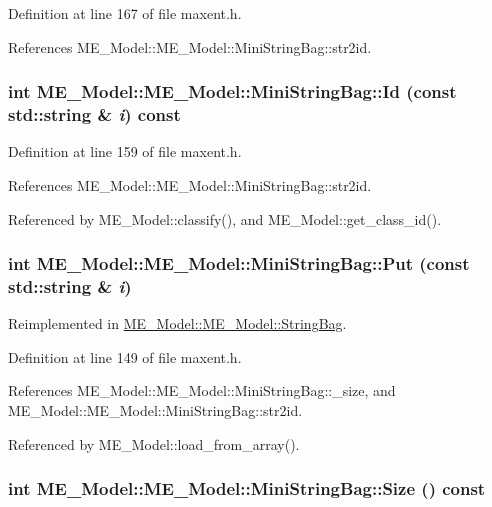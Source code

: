 Definition at line 167 of file maxent.h.

References ME\_\-Model::ME\_\-Model::MiniStringBag::str2id.\hypertarget{structME__Model_1_1MiniStringBag_65ba142e048cf3786852bd42d7171fc1}{
\subsubsection[{Id}]{\setlength{\rightskip}{0pt plus 5cm}int ME\_\-Model::ME\_\-Model::MiniStringBag::Id (const std::string \& {\em i}) const}}
\label{structME__Model_1_1MiniStringBag_65ba142e048cf3786852bd42d7171fc1}




Definition at line 159 of file maxent.h.

References ME\_\-Model::ME\_\-Model::MiniStringBag::str2id.

Referenced by ME\_\-Model::classify(), and ME\_\-Model::get\_\-class\_\-id().\hypertarget{structME__Model_1_1MiniStringBag_32f0102a227ee280ebda9e3555bb1fb1}{
\subsubsection[{Put}]{\setlength{\rightskip}{0pt plus 5cm}int ME\_\-Model::ME\_\-Model::MiniStringBag::Put (const std::string \& {\em i})}}
\label{structME__Model_1_1MiniStringBag_32f0102a227ee280ebda9e3555bb1fb1}




Reimplemented in \hyperlink{structME__Model_1_1StringBag_d31d8c058e0795df0d25ee806088db1a}{ME\_\-Model::ME\_\-Model::StringBag}.

Definition at line 149 of file maxent.h.

References ME\_\-Model::ME\_\-Model::MiniStringBag::\_\-size, and ME\_\-Model::ME\_\-Model::MiniStringBag::str2id.

Referenced by ME\_\-Model::load\_\-from\_\-array().\hypertarget{structME__Model_1_1MiniStringBag_1d8f0f0b7cd9749b7173a12fbbccabbc}{
\subsubsection[{Size}]{\setlength{\rightskip}{0pt plus 5cm}int ME\_\-Model::ME\_\-Model::MiniStringBag::Size () const}}
\label{structME__Model_1_1MiniStringBag_1d8f0f0b7cd9749b7173a12fbbccabbc}




